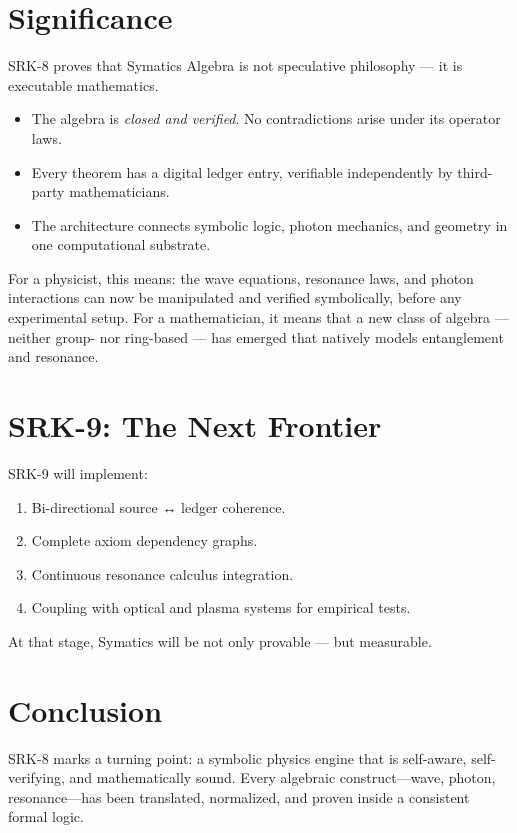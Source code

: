 \documentclass[12pt]{article}
\begin{document}
\section{Significance}

SRK-8 proves that Symatics Algebra is not speculative philosophy — it is executable mathematics.

\begin{itemize}[noitemsep]
    \item The algebra is \emph{closed and verified}. No contradictions arise under its operator laws.
    \item Every theorem has a digital ledger entry, verifiable independently by third-party mathematicians.
    \item The architecture connects symbolic logic, photon mechanics, and geometry in one computational substrate.
\end{itemize}

For a physicist, this means: the wave equations, resonance laws, and photon interactions can now be manipulated and verified symbolically, before any experimental setup.  
For a mathematician, it means that a new class of algebra — neither group- nor ring-based — has emerged that natively models entanglement and resonance.

\section{SRK-9: The Next Frontier}

SRK-9 will implement:
\begin{enumerate}[noitemsep]
    \item Bi-directional source ↔ ledger coherence.
    \item Complete axiom dependency graphs.
    \item Continuous resonance calculus integration.
    \item Coupling with optical and plasma systems for empirical tests.
\end{enumerate}

At that stage, Symatics will be not only provable — but measurable.

\section{Conclusion}

SRK-8 marks a turning point: a symbolic physics engine that is self-aware, self-verifying, and mathematically sound.  
Every algebraic construct—wave, photon, resonance—has been translated, normalized, and proven inside a consistent formal logic.
\end{document}
